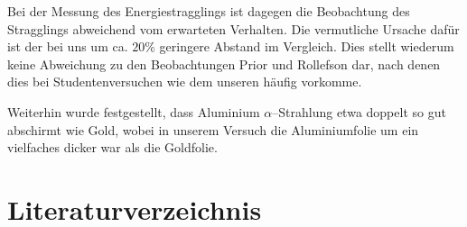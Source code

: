 \documentclass[12pt,a4paper]{scrartcl}
\numberwithin{equation}{section} %
\begin{document}
Bei der Messung des Energiestragglings ist dagegen die Beobachtung des Stragglings abweichend vom erwarteten Verhalten. Die vermutliche Ursache dafür ist der bei uns um ca. $20\%$ geringere Abstand im Vergleich. Dies stellt wiederum keine Abweichung zu den Beobachtungen Prior und Rollefson dar, nach denen dies bei Studentenversuchen wie dem unseren häufig vorkomme.

Weiterhin wurde festgestellt, dass Aluminium $\alpha$--Strahlung etwa doppelt so gut abschirmt wie Gold, wobei in unserem Versuch die Aluminiumfolie um ein vielfaches dicker war als die Goldfolie.

\clearpage
\hypertarget{literatur}{\section{Literaturverzeichnis}\label{literatur}}
\renewcommand{\section}[2]{}
\end{document}
